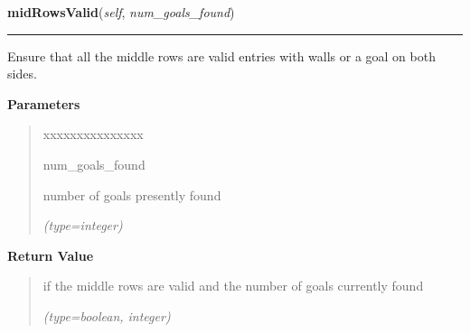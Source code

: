 \hspace{.8\funcindent}\begin{boxedminipage}{\funcwidth}

    \raggedright \textbf{midRowsValid}(\textit{self}, \textit{num\_goals\_found})

    \vspace{-1.5ex}

    \rule{\textwidth}{0.5\fboxrule}
\setlength{\parskip}{2ex}
    Ensure that all the middle rows are valid entries with walls or a goal 
    on both sides.

\setlength{\parskip}{1ex}
      \textbf{Parameters}
      \vspace{-1ex}

      \begin{quote}
        \begin{Ventry}{xxxxxxxxxxxxxxx}

          \item[num\_goals\_found]

          number of goals presently found

            {\it (type=integer)}

        \end{Ventry}

      \end{quote}

      \textbf{Return Value}
    \vspace{-1ex}

      \begin{quote}
      if the middle rows are valid and the number of goals currently found

      {\it (type=boolean, integer)}

      \end{quote}

    \end{boxedminipage}

    \label{UnBlockMeSolver:Map:Map:Map:playerFound}

    \vspace{0.5ex}

